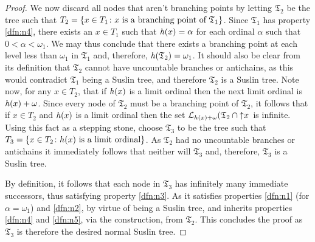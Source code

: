 \begin{proof}
	We now discard all nodes that aren't branching points by letting $\mathfrak{T}_2$ be the tree such that $T_2=\left\lbrace x\in T_1\colon x\text{ is a branching point of }\mathfrak{T}_1 \right\rbrace$.  Since $\mathfrak{T}_1$ has property \ref{dfn:n4}, there exists an $x\in T_1$ such that $\mathit{h}(x)=\alpha$ for each ordinal $\alpha$ such that $0<\alpha<\omega_1$.  We may thus conclude that there exists a branching point at each level less than $\omega_1$ in $\mathfrak{T}_1$ and, therefore, $\mathit{h}(\mathfrak{T}_2)=\omega_1$.  It should also be clear from its definition that $\mathfrak{T}_2$ cannot have uncountable branches or antichains, as this would contradict $\mathfrak{T}_1$ being a Suslin tree, and therefore $\mathfrak{T}_2$ is a Suslin tree.  Note now, for any $x\in T_2$, that if $\mathit{h}(x)$ is a limit ordinal then the next limit ordinal is $\mathit{h}(x)+\omega$.  Since every node of $\mathfrak{T}_2$ must be a branching point of $\mathfrak{T}_2$, it follows that if $x\in T_2$ and $\mathit{h}(x)$ is a limit ordinal then the set $\mathcal{L}_{h(x)+\omega}(\mathfrak{T}_2\cap\left\uparrow x\right.$ is infinite.  Using this fact as a stepping stone, choose $\mathfrak{T}_3$ to be the tree such that $T_3=\left\lbrace x\in T_2\colon h(x)\text{ is a limit ordinal} \right\rbrace$.  As $\mathfrak{T}_2$ had no uncountable branches or antichains it immediately follows that neither will $\mathfrak{T}_3$ and, therefore, $\mathfrak{T}_3$ is a Suslin tree.

	By definition, it follows that each node in $\mathfrak{T}_3$ has infinitely many immediate successors, thus satisfying property \ref{dfn:n3}.  As it satisfies properties \ref{dfn:n1} (for $\alpha=\omega_1$) and \ref{dfn:n2}, by virtue of being a Suslin tree, and inherits properties \ref{dfn:n4} and \ref{dfn:n5}, via the construction, from $\mathfrak{T}_2$.  This concludes the proof as $\mathfrak{T}_3$ is therefore the desired normal Suslin tree.
\end{proof}


